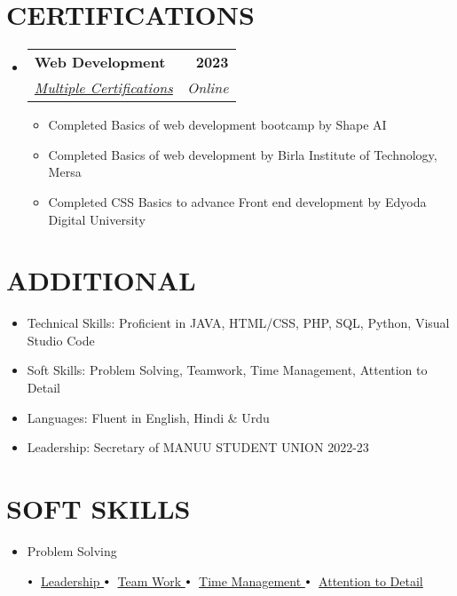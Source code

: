 \documentclass[letterpaper,11pt]{article}
\makeatletter
\newcommand{\resumeItem}[1]{
  \item\small{
    {#1 \vspace{-2pt}}
  }
}
\newcommand{\resumeSubheading}[4]{
  \vspace{-2pt}\item
    \begin{tabular*}{1.0\textwidth}[t]{l@{\extracolsep{\fill}}r}
      \textbf{\large#1} & \textbf{\small #2} \\
      \textit{\large#3} & \textit{\small #4} \\
      
    \end{tabular*}\vspace{-7pt}
}
\newcommand{\resumeSubHeadingListStart}{\begin{itemize}[leftmargin=0.0in, label={}]}
\newcommand{\resumeSubHeadingListEnd}{\end{itemize}}
\newcommand{\resumeItemListStart}{\begin{itemize}}
\newcommand{\resumeItemListEnd}{\end{itemize}\vspace{-5pt}}
\newcommand\sbullet[1][.5]{\mathbin{\vcenter{\hbox{\scalebox{#1}{$\bullet$}}}}}
\makeatother
\begin{document}
\section{CERTIFICATIONS}
  \resumeSubHeadingListStart
    \resumeSubheading
      {Web Development}{2023}
      {\underline{Multiple Certifications}}{Online}
      \resumeItemListStart
        \resumeItem{\normalsize{Completed Basics of web development bootcamp by Shape AI}}
        \resumeItem{\normalsize{Completed Basics of web development by Birla Institute of Technology, Mersa}}
        \resumeItem{\normalsize{Completed CSS Basics to advance Front end development by Edyoda Digital University}}
      \resumeItemListEnd  
  \resumeSubHeadingListEnd
\vspace{-12pt}

 
\section{ADDITIONAL}
    \resumeSubHeadingListStart
            \resumeItemListStart
                \resumeItem{\normalsize{Technical Skills: Proficient in JAVA, HTML/CSS, PHP, SQL, Python, Visual Studio Code}}
                \resumeItem{\normalsize{Soft Skills: Problem Solving, Teamwork, Time Management, Attention to Detail}}
                \resumeItem{\normalsize{Languages: Fluent in English, Hindi & Urdu}}
                \resumeItem{\normalsize{Leadership: Secretary of MANUU STUDENT UNION 2022-23}}
            \resumeItemListEnd{}
    \resumeSubHeadingListEnd
 \vspace{-11pt}

 \section{SOFT SKILLS}
    \resumeSubHeadingListStart
            \resumeItemListStart
                  \resumeItem{\normalsize{Problem Solving \textbf{}}}
                $\sbullet[.75] \hspace{0.1cm}$ 
                {\href{certificateLink.com}{Leadership 
                }} \hspace{0.1cm}
                 $\sbullet[.75] \hspace{0.1cm}$ 
                {\href{certificateLink.com}{Team Work }} \hspace{0.1cm} $\sbullet[.75] \hspace{0.1cm}$ 
                {\href{certificateLink.com}{Time Management }} \hspace{0.1cm}
                 $\sbullet[.75] \hspace{0.1cm}$ {\href{certificateLink.com}{Attention to Detail }} \hspace{0.1cm}
            \resumeItemListEnd
    \resumeSubHeadingListEnd
 \vspace{-11pt}
\end{document}
